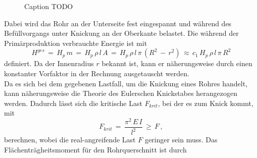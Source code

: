 \begin{figure}[H]
	\centering
	\qquad
	\caption{Caption TODO}
	\label{fig:3_5}
\end{figure}
Dabei wird das Rohr an der Unterseite fest eingespannt und während des Befüllvorgangs unter Knickung an der Oberkante belastet. Die während der Primärproduktion verbrauchte Energie ist mit
\begin{equation}\label{energie33}
H^{ges}\,=\,H_p\,m\,=\,H_p\,\rho\,l\,A\,=\,H_p\,\rho\,l\,\pi\,\left(R^2\,-\,r^2\right)\,\approx\,c_1\,H_p\,\rho\,l\,\pi\,R^2
\end{equation}
definiert. Da der Innenradius $r$ bekannt ist, kann er näherungsweise durch einen konstanter Vorfaktor in der Rechnung ausgetauscht werden.\\
Da es sich bei dem gegebenen Lastfall, um die Knickung eines Rohres handelt, kann näherungsweise die Theorie des Eulerschen Knickstabes herangezogen werden. Dadurch lässt sich die kritische Last $F_{krit}$, bei der es zum Knick kommt, mit
\begin{equation}\label{fkrit33}
F_{krit}\,=\,\frac{\pi^2\,E\,I}{l^2}\,\ge\,F\,,
\end{equation}
berechnen, wobei die real-angreifende Last $F$ geringer sein muss.
Das Flächenträgheitsmoment für den Rohrquerschnitt ist durch
